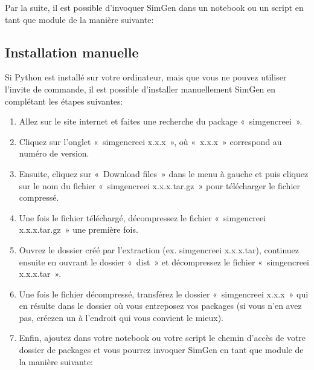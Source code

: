 \documentclass[letterpaper,10pt,french]{sphinxmanual}
\begin{document}
Par la suite, il est possible d’invoquer SimGen dans un notebook ou un script en tant que module de la manière suivante:

\begin{sphinxVerbatim}[commandchars=\\\{\}]
 
\end{sphinxVerbatim}


\subsection{Installation manuelle}
\label{\detokenize{installation:installation-manuelle}}
Si Python est installé sur votre ordinateur, mais que vous ne pouvez utiliser l’invite de commande,
il est possible d’installer manuellement SimGen en complétant les étapes suivantes:
\begin{enumerate}
%
\item {} 
Allez sur le site internet  et faites une recherche du package « simgen\sphinxhyphen{}creei ».

\item {} 
Cliquez sur l’onglet « simgen\sphinxhyphen{}creei x.x.x », où « x.x.x » correspond au numéro de version.

\item {} 
Ensuite, cliquez sur « Download files » dans le menu à gauche et puis cliquez sur le nom du fichier « simgen\sphinxhyphen{}creei x.x.x.tar.gz » pour télécharger le fichier compressé.

\item {} 
Une fois le fichier téléchargé, décompressez le fichier « simgen\sphinxhyphen{}creei x.x.x.tar.gz » une première fois.

\item {} 
Ouvrez le dossier créé par l’extraction (ex. simgen\sphinxhyphen{}creei x.x.x.tar), continuez ensuite en ouvrant le dossier « dist » et décompressez le fichier « simgen\sphinxhyphen{}creei x.x.x.tar ».

\item {} 
Une fois le fichier décompressé, transférez le dossier « simgen\sphinxhyphen{}creei x.x.x » qui en résulte dans le dossier où vous entreposez vos packages (si vous n’en avez pas, créez\sphinxhyphen{}en un à l’endroit qui vous convient le mieux).

\item {} 
Enfin, ajoutez dans votre notebook ou votre script le chemin d’accès de votre dossier de packages et vous pourrez invoquer SimGen en tant que module de la manière suivante:

\end{enumerate}
\end{document}
